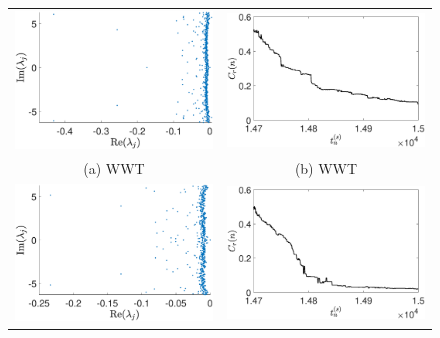 \documentclass[aps,prl,preprint,groupedaddress]{revtex4-1}
\begin{document}
\begin{figure}[!ht]
\centering
\begin{tabular}{cc}
\includegraphics[width=.525\textwidth]{full_spec_wwt_K_256_Lx_128_tf_1_pt5e4} &\hspace{-25pt} \includegraphics[width=.525\textwidth]{cratio_wwt_K_256_Lx_128_tf_1pt5e4}\\
(a) WWT & (b) WWT\\
\includegraphics[width=.525\textwidth]{full_spec_lf_K_256_Lx_128_tf_1_pt5e4} &\hspace{-25pt} \includegraphics[width=.525\textwidth]{cratio_lfforce_K_256_Lx_128_tf_1pt5e4}\\

\end{tabular}
\end{figure}
\end{document}
